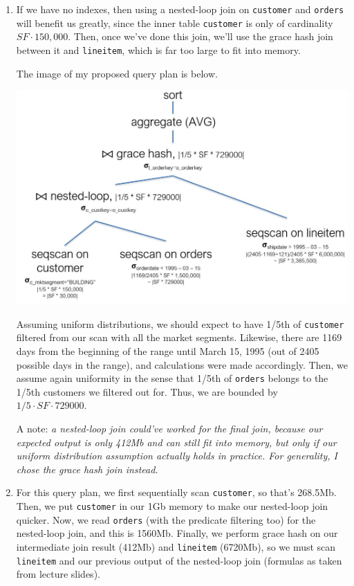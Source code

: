 \documentclass{article}
\begin{document}
\begin{enumerate}[resume]
	
	\item If we have no indexes, then using a nested-loop join on \verb|customer| and \verb|orders| will benefit us greatly, since the inner table \verb|customer| is only of cardinality $SF\cdot150,000$. Then, once we've done this join, we'll use the grace hash join between it and \verb|lineitem|, which is far too large to fit into memory.

	The image of my proposed query plan is below.

	\begin{center}
	\includegraphics[scale=0.5]{q13.JPG}
	\end{center}

	Assuming uniform distributions, we should expect to have 1/5th of \verb|customer| filtered from our scan with all the market segments. Likewise, there are 1169 days from the beginning of the range until March 15, 1995 (out of 2405 possible days in the range), and calculations were made accordingly. Then, we assume again uniformity in the sense that 1/5th of \verb|orders| belongs to the 1/5th customers we filtered out for. Thus, we are bounded by $1/5\cdot SF\cdot 729000$. 

	A note: \emph{a nested-loop join could've worked for the final join, because our expected output is only 412Mb and can still fit into memory, but only if our uniform distribution assumption actually holds in practice. For generality, I chose the grace hash join instead.}

	\item For this query plan, we first sequentially scan \verb|customer|, so that's 268.5Mb. Then, we put \verb|customer| in our 1Gb memory to make our nested-loop join quicker. Now, we read \verb|orders| (with the predicate filtering too) for the nested-loop join, and this is 1560Mb. Finally, we perform grace hash on our intermediate join result (412Mb) and \verb|lineitem| (6720Mb), so we must scan \verb|lineitem| and our previous output of the nested-loop join (formulas as taken from lecture slides).


\end{enumerate}
\end{document}
